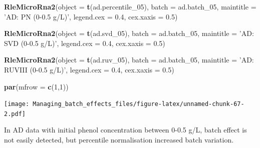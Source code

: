 \documentclass[]{book}
\newenvironment{Shaded}{\begin{snugshade}}{\end{snugshade}}
\newcommand{\KeywordTok}[1]{\textcolor[rgb]{0.13,0.29,0.53}{\textbf{#1}}}
\newcommand{\DataTypeTok}[1]{\textcolor[rgb]{0.13,0.29,0.53}{#1}}
\newcommand{\DecValTok}[1]{\textcolor[rgb]{0.00,0.00,0.81}{#1}}
\newcommand{\FloatTok}[1]{\textcolor[rgb]{0.00,0.00,0.81}{#1}}
\newcommand{\StringTok}[1]{\textcolor[rgb]{0.31,0.60,0.02}{#1}}
\newcommand{\NormalTok}[1]{#1}
\begin{document}
\begin{Shaded}
\begin{Highlighting}[]
\KeywordTok{RleMicroRna2}\NormalTok{(}\DataTypeTok{object =} \KeywordTok{t}\NormalTok{(ad.percentile_}\DecValTok{05}\NormalTok{), }\DataTypeTok{batch =}\NormalTok{ ad.batch_}\DecValTok{05}\NormalTok{, }
             \DataTypeTok{maintitle =} \StringTok{'AD: PN (0-0.5 g/L)'}\NormalTok{, }\DataTypeTok{legend.cex =} \FloatTok{0.4}\NormalTok{, }
             \DataTypeTok{cex.xaxis =} \FloatTok{0.5}\NormalTok{)}

\KeywordTok{RleMicroRna2}\NormalTok{(}\DataTypeTok{object =} \KeywordTok{t}\NormalTok{(ad.svd_}\DecValTok{05}\NormalTok{), }\DataTypeTok{batch =}\NormalTok{ ad.batch_}\DecValTok{05}\NormalTok{, }
             \DataTypeTok{maintitle =} \StringTok{'AD: SVD (0-0.5 g/L)'}\NormalTok{, }\DataTypeTok{legend.cex =} \FloatTok{0.4}\NormalTok{, }
             \DataTypeTok{cex.xaxis =} \FloatTok{0.5}\NormalTok{)}

\KeywordTok{RleMicroRna2}\NormalTok{(}\DataTypeTok{object =} \KeywordTok{t}\NormalTok{(ad.ruv_}\DecValTok{05}\NormalTok{), }\DataTypeTok{batch =}\NormalTok{ ad.batch_}\DecValTok{05}\NormalTok{, }
             \DataTypeTok{maintitle =} \StringTok{'AD: RUVIII (0-0.5 g/L)'}\NormalTok{, }\DataTypeTok{legend.cex =} \FloatTok{0.4}\NormalTok{, }
             \DataTypeTok{cex.xaxis =} \FloatTok{0.5}\NormalTok{)}

\KeywordTok{par}\NormalTok{(}\DataTypeTok{mfrow =} \KeywordTok{c}\NormalTok{(}\DecValTok{1}\NormalTok{,}\DecValTok{1}\NormalTok{))}
\end{Highlighting}
\end{Shaded}

\texttt{[image: Managing\_batch\_effects\_files/figure-latex/unnamed-chunk-67-2.pdf]}

In AD data with initial phenol concentration between 0-0.5 g/L, batch
effect is not easily detected, but percentile normalisation increased
batch variation.
\end{document}
